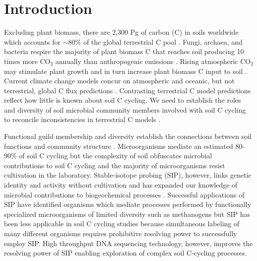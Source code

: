 \section{Introduction}
Excluding plant biomass, there are 2,300 Pg of carbon (C) in soils
worldwide which accounts for $\sim$80\% of the global terrestrial C pool
\citep{Amundson_2001,BATJES_1996}. Fungi, archaea, and bacteria respire the
majority of plant biomass C that reaches soil producing 10 times more CO$_{2}$
annually than anthropogenic emissions \citep{chapin2002principles}. Rising
atmospheric CO$_{2}$ may stimulate plant growth and in turn increase plant
biomass C input to soil \citep{Groenigen_2006}. Current climate change models
concur on atmospheric and oceanic, but not terrestrial, global C flux
predictions \citep{Friedlingstein_2006}. Contrasting terrestrial C model
predictions reflect how little is known about soil C cycling. We need to
establish the roles and diversity of soil microbial community members involved
with soil C cycling to reconcile inconsistencies in terrestrial C models
\citep{Neff_2001,McGuire2010}.

Functional guild membership and diversity establish the connections between
soil functions and community structure \citep{O_Donnell_2002}. Microorganisms
mediate an estimated 80-90\% of soil C cycling
\citep{ColemanCrossley_1996,Nannipieri_2003} but the complexity of soil
obfuscates microbial contributions to soil C cycling and the majority of
microorganisms resist cultivation in the laboratory. Stable-isotope probing
(SIP), however, links genetic identity and activity without cultivation and has
expanded our knowledge of microbial contributions to biogeochemical processes
\citep{Chen_Murrell_2010}. Successful applications of SIP have identified
organisms which mediate processes performed by functionally specialized
microorganisms of limited diversity such as methanogens \citep{Lu_2005} but SIP
has been less applicable in soil C cycling studies because simultaneous
labeling of many different organisms requires prohibitive resolving power to
successfully employ SIP. High throughput DNA sequencing technology, however,
improves the resolving power of SIP enabling exploration of complex soil
C-cycling processes.

